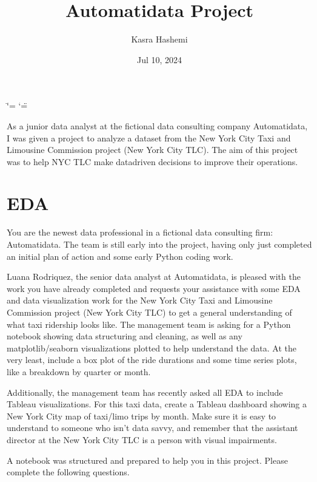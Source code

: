 \documentclass[letterpaper,10pt,english]{sphinxmanual}
\title{Automatidata Project}
\date{Jul 10, 2024}
\author{Kasra Hashemi}
\begin{document}
\ifdefined\shorthandoff
  \ifnum\catcode`\=\string=\active\shorthandoff{=}\fi
  \ifnum\catcode`\"=\active{}\fi
\fi

\pagestyle{empty}
\sphinxmaketitle
\pagestyle{plain}
\tableofcontents
\newpage
\pagestyle{normal}
\label{\detokenize{index::doc}}


\sphinxAtStartPar
As a junior data analyst at the fictional data consulting company Automatidata, I was given a project to analyze a dataset from the New York City Taxi and Limousine Commission project (New York City TLC). The aim of this project was to help NYC TLC make data\sphinxhyphen{}driven decisions to improve their operations.

\sphinxstepscope


\chapter{EDA}
\label{\detokenize{Automatidata_EDA:eda}}\label{\detokenize{Automatidata_EDA::doc}}
\sphinxAtStartPar
You are the newest data professional in a fictional data consulting firm: Automatidata. The team is still early into the project, having only just completed an initial plan of action and some early Python coding work.

\sphinxAtStartPar
Luana Rodriquez, the senior data analyst at Automatidata, is pleased with the work you have already completed and requests your assistance with some EDA and data visualization work for the New York City Taxi and Limousine Commission project (New York City TLC) to get a general understanding of what taxi ridership looks like. The management team is asking for a Python notebook showing data structuring and cleaning, as well as any matplotlib/seaborn visualizations plotted to help understand the data. At the very least, include a box plot of the ride durations and some time series plots, like a breakdown by quarter or month.

\sphinxAtStartPar
Additionally, the management team has recently asked all EDA to include Tableau visualizations. For this taxi data, create a Tableau dashboard showing a New York City map of taxi/limo trips by month. Make sure it is easy to understand to someone who isn’t data savvy, and remember that the assistant director at the New York City TLC is a person with visual impairments.

\sphinxAtStartPar
A notebook was structured and prepared to help you in this project. Please complete the following questions.
\end{document}

